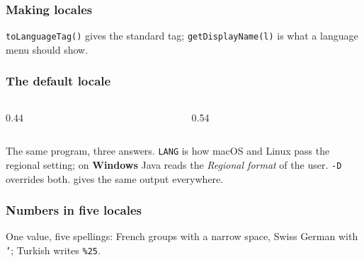 \documentclass[aspectratio=169,10pt,compress]{beamer}
\newcommand{\win}{\textbf{Windows}}
\begin{document}




\begin{frame}[t,fragile] \frametitle{Making locales}

  \vspace{0.1em}
  \small \texttt{toLanguageTag()} gives the standard tag; \texttt{getDisplayName(l)} is what a language menu should show.
\end{frame}




\begin{frame}[t,fragile] \frametitle{The default locale}
  \begin{columns}[T]
    \begin{column}{0.44\textwidth}
    \end{column}
    \begin{column}{0.54\textwidth}
    \end{column}
  \end{columns}
  \vspace{0.1em}
  \small The same program, three answers. \texttt{LANG} is how macOS and Linux pass the regional setting;
  on \win{} Java reads the \emph{Regional format} of the user. \texttt{-D} overrides both.
   gives the same output everywhere.
\end{frame}





\begin{frame}[t,fragile] \frametitle{Numbers in five locales}

  \vspace{0.1em}
  \small One value, five spellings: French groups with a narrow space, Swiss German with \texttt{'}; Turkish writes \texttt{\%25}.
\end{frame}
\end{document}
